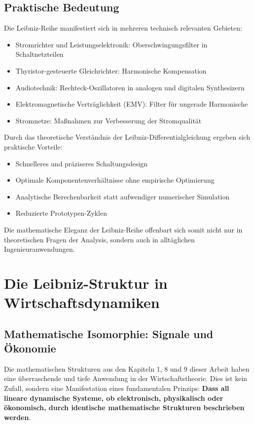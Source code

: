 \documentclass[a4paper,12pt,twoside]{report}
\theoremstyle{definition}
\begin{document}
\subsection{Praktische Bedeutung}

Die Leibniz-Reihe manifestiert sich in mehreren technisch relevanten Gebieten:

\begin{itemize}
	\item Stromrichter und Leistungselektronik: Oberschwingungsfilter in Schaltnetzteilen
	\item Thyristor-gesteuerte Gleichrichter: Harmonische Kompensation
	\item Audiotechnik: Rechteck-Oszillatoren in analogen und digitalen Synthesizern
	\item Elektromagnetische Verträglichkeit (EMV): Filter für ungerade Harmonische
	\item Stromnetze: Maßnahmen zur Verbesserung der Stromqualität
\end{itemize}

Durch das theoretische Verständnis der Leibniz-Differentialgleichung ergeben sich praktische Vorteile:

\begin{itemize}
	\item Schnelleres und präziseres Schaltungsdesign
	\item Optimale Komponentenverhältnisse ohne empirische Optimierung
	\item Analytische Berechenbarkeit statt aufwendiger numerischer Simulation
	\item Reduzierte Prototypen-Zyklen
\end{itemize}

Die mathematische Eleganz der Leibniz-Reihe offenbart sich somit nicht nur in theoretischen Fragen der Analysis, sondern auch in alltäglichen Ingenieuranwendungen.

\section{Die Leibniz-Struktur in Wirtschaftsdynamiken}

\subsection{Mathematische Isomorphie: Signale und Ökonomie}

Die mathematischen Strukturen aus den Kapiteln 1, 8 und 9 dieser Arbeit haben eine überraschende und tiefe Anwendung in der Wirtschaftstheorie. Dies ist kein Zufall, sondern eine Manifestation eines fundamentalen Prinzips: \textbf{Dass all lineare dynamische Systeme, ob elektronisch, physikalisch oder ökonomisch, durch identische mathematische Strukturen beschrieben werden}.
\end{document}
